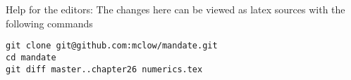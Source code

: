 
\vfill
Help for the editors: The changes here can be viewed as latex sources with the following commands
\begin{verbatim}
git clone git@github.com:mclow/mandate.git
cd mandate
git diff master..chapter26 numerics.tex
\end{verbatim}
